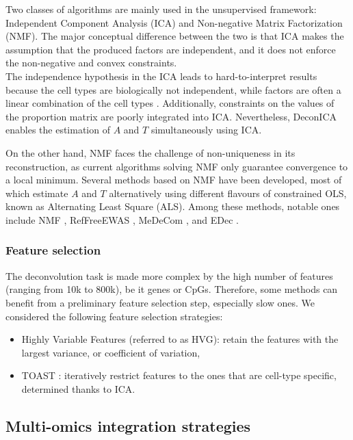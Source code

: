 \documentclass{article}
\begin{document}
Two classes of algorithms are mainly used in the unsupervised framework: Independent Component Analysis (ICA) and Non-negative Matrix Factorization (NMF).
The major conceptual difference between the two is that ICA makes the assumption that the produced factors are independent, and it does not enforce the non-negative and convex constraints. \\

The independence hypothesis in the ICA leads to hard-to-interpret results because the cell types are biologically not independent, while factors are often a linear combination of the cell types \cite{rahmani_2018_bayescce}.
Additionally, constraints on the values of the proportion matrix are poorly integrated into ICA. 
Nevertheless, DeconICA \cite{DeconICA} enables the estimation of $A$ and $T$ simultaneously using ICA.

On the other hand, NMF faces the challenge of non-uniqueness in its reconstruction, as current algorithms solving NMF only guarantee convergence to a local minimum.
Several methods based on NMF have been developed, most of which estimate $A$ and $T$ alternatively using different flavours of constrained OLS, known as Alternating Least Square (ALS).
Among these methods, notable ones include NMF \cite{DECONnmf}, RefFreeEWAS \cite{RefFreeEWAS}, MeDeCom \cite{MeDeCom}, and EDec \cite{EDec}.

\subsubsection{Feature selection}\label{subsubsec:optional-feature-selection}

The deconvolution task is made more complex by the high number of features (ranging from 10k to 800k), be it genes or CpGs.
Therefore, some methods can benefit from a preliminary feature selection step, especially slow ones.
We considered the following feature selection strategies:
\begin{itemize}
    \item Highly Variable Features (referred to as HVG): retain the features with the largest variance, or coefficient of variation,
    \item TOAST \cite{TOAST}: iteratively restrict features to the ones that are cell-type specific, determined thanks to ICA.
\end{itemize}

\subsection{Multi-omics integration strategies}\label{subsec:multi-omics-integration-strategies}
\end{document}

